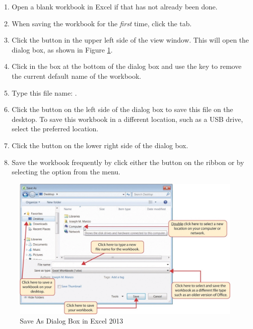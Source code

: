 \begin{enumerate}
	\item Open a blank workbook in Excel if that has not already been done.
	\item When saving the workbook for the \textit{first} time, click the  tab.
	\item Click the  button in the upper left side of the  view window. This will open the  dialog box, as shown in Figure \ref{01:fig11}.
	\item Click in the  box at the bottom of the  dialog box and use the  key to remove the current default name of the workbook.
	\item Type this file name: .
	\item Click the  button on the left side of the  dialog box to save this file on the desktop. To save this workbook in a different location, such as a USB drive, select the preferred location.
	\item Click the  button on the lower right side of the  dialog box.
	\item Save the workbook frequently by click either the  button on the  ribbon or by selecting the  option from the  menu.
\end{enumerate}

\begin{figure}[H]
	\centering
	\includegraphics[width=\maxwidth{.95\linewidth}]{gfx/ch01_fig11}
	\caption{Save As Dialog Box in Excel 2013}
	\label{01:fig11}
\end{figure}

